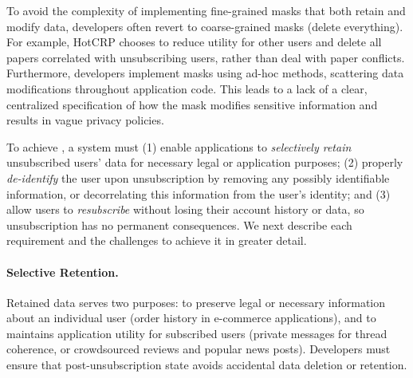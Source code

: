 To avoid the complexity of implementing fine-grained masks that both retain and modify data, developers often revert to coarse-grained masks (\eg delete everything). For example, HotCRP chooses to reduce utility
for other users and delete all papers correlated with unsubscribing users, rather than deal with
paper conflicts.
%
Furthermore, developers implement masks using ad-hoc methods, scattering data modifications throughout
application code. This leads to a lack of a clear, centralized specification of how the mask modifies
sensitive information and results in \eg vague privacy policies.


\iffalse
To achieve \name, a system must (1) enable applications to \emph{selectively retain} unsubscribed
users' data for necessary legal or application purposes; (2) properly \emph{de-identify} the user
upon unsubscription by removing any possibly identifiable information, or decorrelating this
information from the user's identity; and (3) allow users to \emph{resubscribe} without losing their
account history or data, so unsubscription has no permanent consequences. We next describe each
requirement and the challenges to achieve it in greater detail.

\paragraph{Selective Retention.}
Retained data serves two purposes: to preserve legal or
necessary information about an individual user (\eg order history in e-commerce applications), and
to maintains application utility for subscribed users (\eg private messages
for thread coherence, or crowdsourced reviews and popular news posts).
Developers must ensure that post-unsubscription state avoids accidental data deletion or retention.

